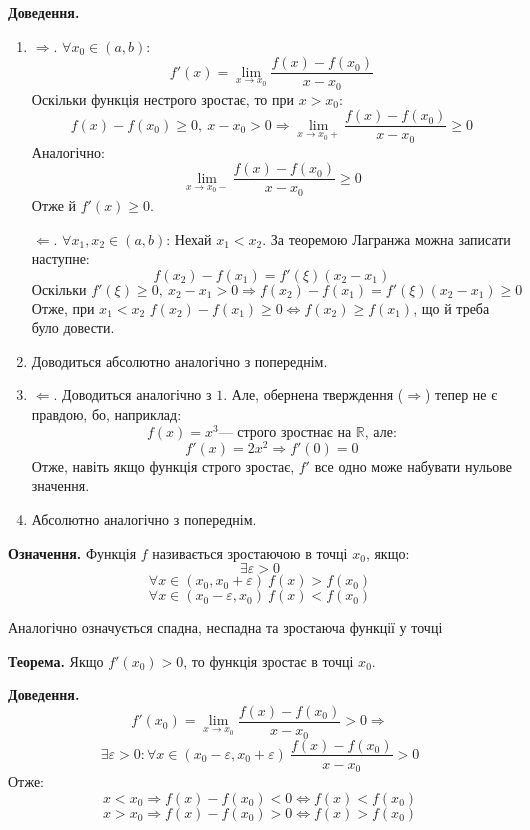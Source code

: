 \documentclass[12pt]{report}
\begin{document}
\textbf{Доведення.} 
\begin{enumerate}
\item $\Longrightarrow$. $\forall x_0 \in (a,b)$:
$$f'(x) = \lim_{x \to x_0}\frac{f(x) - f(x_0)}{x - x_0}$$
Оскільки функція нестрого зростає, то при $x > x_0$:
$$f(x) - f(x_0) \geq 0,\ x - x_0 > 0 \Longrightarrow \lim_{x \to x_0+}\frac{f(x) - f(x_0)}{x - x_0} \geq 0$$
Аналогічно:
$$\lim_{x \to x_0-}\frac{f(x) - f(x_0)}{x - x_0} \geq 0$$
Отже й $f'(x) \geq 0$.

\vspace{2mm}

$\Longleftarrow$. $\forall x_1, x_2 \in (a,b)$:
Нехай $x_1 < x_2$. За теоремою Лагранжа можна записати наступне:
$$f(x_2) - f(x_1) = f'(\xi)(x_2 - x_1)$$
$$\textrm{Оскільки } f'(\xi) \geq 0,\ x_2 - x_1 > 0 \Longrightarrow f(x_2) - f(x_1) = f'(\xi)(x_2 - x_1) \geq 0$$
Отже, при $x_1 < x_2$ $f(x_2) - f(x_1) \geq 0 \Longleftrightarrow f(x_2) \geq f(x_1)$, що й треба було довести.

\item Доводиться абсолютно аналогічно з попереднім.

\item $\Longleftarrow$. Доводиться аналогічно з $1$. Але, обернена тверждення ($\Longrightarrow$) тепер не є правдою, бо, наприклад:
$$f(x) = x^3\textrm{--- строго зростнає на $\mathbb{R}$, але:}$$
$$f'(x) = 2x^2 \Longrightarrow f'(0) = 0$$
Отже, навіть якщо функція строго зростає, $f'$ все одно може набувати нульове значення.
\item Абсолютно аналогічно з попереднім.
\end{enumerate}

\textbf{Означення.} Функція $f$ називається зростаючою в точці $x_0$, якщо:
$$\exists \varepsilon > 0$$
$$\forall x \in (x_0, x_0 + \varepsilon)\ f(x) > f(x_0)$$
$$\forall x \in (x_0 - \varepsilon, x_0)\ f(x) < f(x_0)$$

Аналогічно означується спадна, неспадна та зростаюча функції у точці

\vspace{3mm}

\textbf{Теорема.} Якщо $f'(x_0) > 0$, то функція зростає в точці $x_0$.

\textbf{Доведення.} 
$$f'(x_0) = \lim_{x \to x_0}\frac{f(x) - f(x_0)}{x - x_0} > 0 \Longrightarrow$$
$$\exists \varepsilon > 0 : \forall x \in (x_0 - \varepsilon, x_0 + \varepsilon)\ \frac{f(x) - f(x_0)}{x - x_0} > 0$$
Отже:
$$x < x_0 \Longrightarrow f(x) - f(x_0) < 0 \Longleftrightarrow f(x) < f(x_0)$$
$$x > x_0 \Longrightarrow f(x) - f(x_0) > 0 \Longleftrightarrow f(x) > f(x_0)$$
\end{document}
